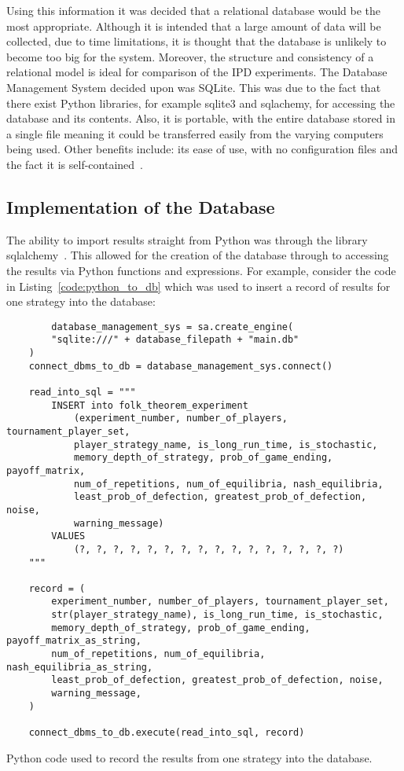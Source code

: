 Using this information it was decided that a relational database would be the
most appropriate. Although it is intended that a large amount of data will be
collected, due to time limitations, it is thought that the database is unlikely
to become too big for the system. Moreover, the structure and consistency of a
relational model is ideal for comparison of the IPD experiments. The Database
Management System decided upon was SQLite. This was due to the fact that there
exist Python libraries, for example sqlite3 and sqlachemy, for accessing the
database and its contents. Also, it is portable, with the entire database stored
in a single file meaning it could be transferred easily from the varying
computers being used. Other benefits include: its ease of
use, with no configuration files and the fact it is self-contained~\cite{ostezer2019}.  

\subsection{Implementation of the Database}
The ability to import results straight from Python was through the library
sqlalchemy~\cite{sqlalchemy}. This allowed for the creation of the database
through to accessing the results via Python functions and expressions.  
For example, consider the code in Listing~\ref{code:python_to_db} which was used to insert a record of
results for one strategy into the database:
\begin{listing}
\begin{verbatim}
        database_management_sys = sa.create_engine(
        "sqlite:///" + database_filepath + "main.db"
    )
    connect_dbms_to_db = database_management_sys.connect()

    read_into_sql = """
        INSERT into folk_theorem_experiment 
            (experiment_number, number_of_players, tournament_player_set, 
            player_strategy_name, is_long_run_time, is_stochastic, 
            memory_depth_of_strategy, prob_of_game_ending, payoff_matrix, 
            num_of_repetitions, num_of_equilibria, nash_equilibria, 
            least_prob_of_defection, greatest_prob_of_defection, noise, 
            warning_message)
        VALUES 
            (?, ?, ?, ?, ?, ?, ?, ?, ?, ?, ?, ?, ?, ?, ?, ?)
    """

    record = (
        experiment_number, number_of_players, tournament_player_set,
        str(player_strategy_name), is_long_run_time, is_stochastic,
        memory_depth_of_strategy, prob_of_game_ending, payoff_matrix_as_string,
        num_of_repetitions, num_of_equilibria, nash_equilibria_as_string,
        least_prob_of_defection, greatest_prob_of_defection, noise,
        warning_message,
    )

    connect_dbms_to_db.execute(read_into_sql, record)
\end{verbatim}
\caption{Python code used to record the results from one strategy into the database.}\label{code:python_to_db}
\end{listing}

